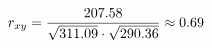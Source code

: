 \documentclass[preview]{standalone}
\begin{document}
\begin{align*}
\special{dvisvgm:raw <g id='unique000'>}r_{xy} = \frac{207.58}{\sqrt{311.09}\cdot\sqrt{290.36}}\approx 0.69\special{dvisvgm:raw </g>}
\end{align*}
\end{document}
